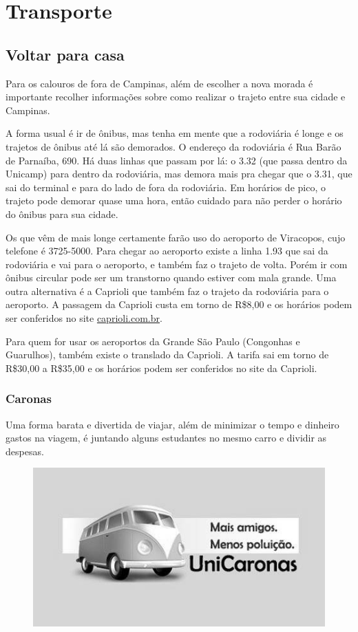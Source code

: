 
\section{Transporte}
\subsection{Voltar para casa}

Para os calouros de fora de Campinas, além de escolher a nova morada é
importante recolher informações sobre como realizar o trajeto entre sua cidade e
Campinas.

A forma usual é ir de ônibus, mas tenha em mente que a rodoviária é longe e os
trajetos de ônibus até lá são demorados. O endereço da rodoviária é Rua Barão de
Parnaíba, 690. Há duas linhas que passam por lá: o 3.32 (que passa dentro da
Unicamp) para dentro da rodoviária, mas demora mais pra chegar que o 3.31, que
sai do terminal e para do lado de fora da rodoviária. Em horários de pico, o
trajeto pode demorar quase uma hora, então cuidado para não perder o horário do
ônibus para sua cidade.

Os que vêm de mais longe certamente farão uso do aeroporto de Viracopos, cujo
telefone é 3725-5000. Para chegar ao aeroporto existe a linha 1.93 que sai da
rodoviária e vai para o aeroporto, e também faz o trajeto de volta. Porém ir com
ônibus circular pode ser um transtorno quando estiver com mala grande. Uma outra
alternativa é a Caprioli que também faz o trajeto da rodoviária para o
aeroporto. A passagem da Caprioli custa em torno de R\$8,00 e os horários podem
ser conferidos no site \url{caprioli.com.br}.

Para quem for usar os aeroportos da Grande São Paulo (Congonhas e Guarulhos),
também existe o translado da Caprioli. A tarifa sai em torno de R\$30,00 a
R\$35,00 e os horários podem ser conferidos no site da Caprioli.

\subsubsection*{Caronas}

Uma forma barata e divertida de viajar, além de minimizar o tempo e dinheiro
gastos na viagem, é juntando alguns estudantes no mesmo carro e dividir as
despesas.
\begin{figure}[h!]
    \centering
    \includegraphics[width=.45\textwidth]{img/barao/unicaronas.jpg}
\end{figure}

